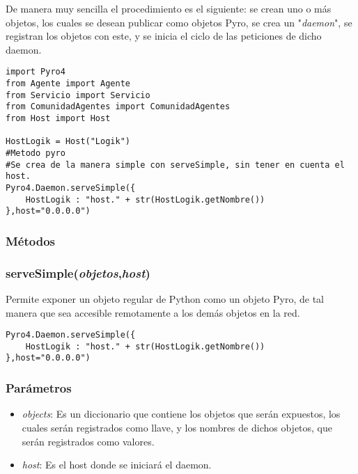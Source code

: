 \documentclass{article}
\begin{document}
De manera muy sencilla el procedimiento es el siguiente: se crean uno o más objetos, los cuales se desean publicar como objetos Pyro, se crea un "\textit{daemon}", se registran los objetos con este, y se inicia el ciclo de las peticiones de dicho daemon.
\begin{lstlisting}
import Pyro4
from Agente import Agente
from Servicio import Servicio
from ComunidadAgentes import ComunidadAgentes
from Host import Host

HostLogik = Host("Logik")
#Metodo pyro
#Se crea de la manera simple con serveSimple, sin tener en cuenta el host.
Pyro4.Daemon.serveSimple({
    HostLogik : "host." + str(HostLogik.getNombre())
},host="0.0.0.0")
\end{lstlisting}
\subsubsection*{Métodos}
\subsubsection{\textbf{serveSimple}(\textit{objetos},\textit{host})}
Permite exponer un objeto regular de Python como un objeto Pyro, de tal manera que sea accesible remotamente a los demás objetos en la red.
\begin{lstlisting}
Pyro4.Daemon.serveSimple({
    HostLogik : "host." + str(HostLogik.getNombre())
},host="0.0.0.0")
\end{lstlisting}
\subsubsection*{Parámetros}
\begin{itemize}
\item \textit{objects}: Es un diccionario que contiene los objetos que serán expuestos, los cuales serán registrados como llave, y los nombres de dichos objetos, que serán registrados como valores.
\item \textit{host}: Es el host donde se iniciará el daemon.
\end{itemize}
\end{document}
